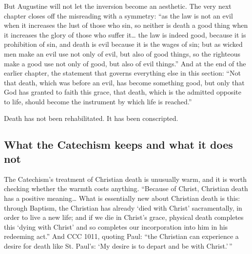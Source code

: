 But Augustine will not let the inversion become an aesthetic. The very next chapter closes off the misreading with a symmetry: ``as the law is not an evil when it increases the lust of those who sin, so neither is death a good thing when it increases the glory of those who suffer it\ldots{} the law is indeed good, because it is prohibition of sin, and death is evil because it is the wages of sin; but as wicked men make an evil use not only of evil, but also of good things, so the righteous make a good use not only of good, but also of evil things.'' And at the end of the earlier chapter, the statement that governs everything else in this section: ``Not that death, which was before an evil, has become something good, but only that God has granted to faith this grace, that death, which is the admitted opposite to life, should become the instrument by which life is reached.''

Death has not been rehabilitated. It has been conscripted.

\subsection{What the Catechism keeps and what it does not}

The Catechism's treatment of Christian death is unusually warm, and it is worth checking whether the warmth costs anything. ``Because of Christ, Christian death has a positive meaning\ldots{} What is essentially new about Christian death is this: through Baptism, the Christian has already `died with Christ' sacramentally, in order to live a new life; and if we die in Christ's grace, physical death completes this `dying with Christ' and so completes our incorporation into him in his redeeming act.'' And CCC 1011, quoting Paul: ``the Christian can experience a desire for death like St. Paul's: `My desire is to depart and be with Christ.'\,''

